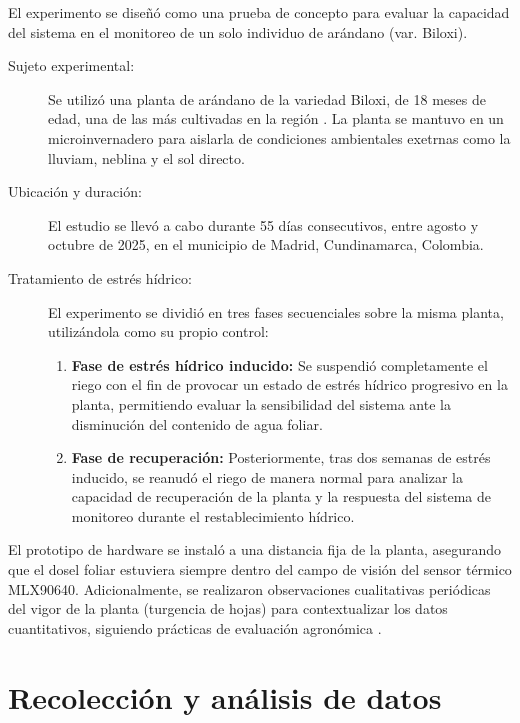El experimento se diseñó como una prueba de concepto para evaluar la capacidad del sistema en el monitoreo de un solo individuo de arándano (var. Biloxi).
\begin{description}
    \item[Sujeto experimental:] Se utilizó una planta de arándano de la variedad Biloxi, de 18 meses de edad, una de las más cultivadas en la región . La planta se mantuvo en un microinvernadero para aislarla de condiciones ambientales exetrnas como la lluviam, neblina y el sol directo.
    \item[Ubicación y duración:] El estudio se llevó a cabo durante 55 días consecutivos, entre agosto y octubre de 2025, en el municipio de Madrid, Cundinamarca, Colombia.
    \item[Tratamiento de estrés hídrico:] El experimento se dividió en tres fases secuenciales sobre la misma planta, utilizándola como su propio control:
        \begin{enumerate}
           \item \textbf{Fase de estrés hídrico inducido:} Se suspendió completamente el riego con el fin de provocar un estado de estrés hídrico progresivo en la planta, permitiendo evaluar la sensibilidad del sistema ante la disminución del contenido de agua foliar.
            \item \textbf{Fase de recuperación:} Posteriormente, tras dos semanas de estrés inducido, se reanudó el riego de manera normal para analizar la capacidad de recuperación de la planta y la respuesta del sistema de monitoreo durante el restablecimiento hídrico.
        \end{enumerate}
\end{description}
El prototipo de hardware se instaló a una distancia fija de la planta, asegurando que el dosel foliar estuviera siempre dentro del campo de visión del sensor térmico MLX90640. Adicionalmente, se realizaron observaciones cualitativas periódicas del vigor de la planta (turgencia de hojas) para contextualizar los datos cuantitativos, siguiendo prácticas de evaluación agronómica .

\section{Recolección y análisis de datos}
\label{sec:exp_recoleccion_analisis}

